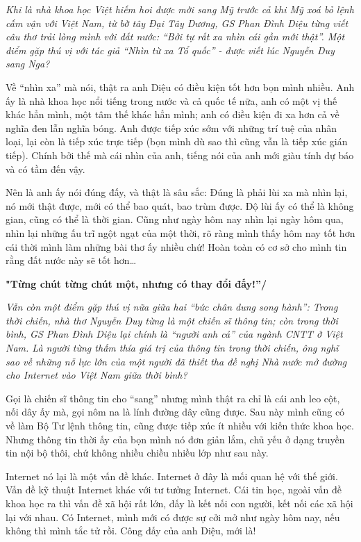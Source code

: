 \emph{Khi là nhà khoa học Việt hiếm hoi được mời sang Mỹ trước cả khi Mỹ xoá bỏ lệnh cấm vận với Việt Nam, từ bờ tây Đại Tây Dương, GS Phan Đình Diệu từng viết câu thơ trải lòng mình với đất nước: “Bởi tự rất xa nhìn cái gần mới thật”. Một điểm gặp thú vị với tác giả “Nhìn từ xa Tổ quốc” - được viết lúc Nguyễn Duy sang Nga?}  

Về “nhìn xa” mà nói, thật ra anh Diệu có điều kiện tốt hơn bọn mình nhiều. Anh ấy là nhà khoa học nổi tiếng trong nước và cả quốc tế nữa, anh có một vị thế khác hẳn mình, một tâm thế khác hẳn mình; anh có điều kiện đi xa hơn cả về nghĩa đen lẫn nghĩa bóng. Anh được tiếp xúc sớm với những trí tuệ của nhân loại, lại còn là tiếp xúc trực tiếp (bọn mình dù sao thì cũng vẫn là tiếp xúc gián tiếp). Chính bởi thế mà cái nhìn của anh, tiếng nói của anh mới giàu tính dự báo và có tầm đến vậy.


Nên là anh ấy nói đúng đấy, và thật là sâu sắc: Đúng là phải lùi xa mà nhìn lại, nó mới thật được, mới có thể bao quát, bao trùm được. Độ lùi ấy có thể là không gian, cũng có thể là thời gian. Cũng như ngày hôm nay nhìn lại ngày hôm qua, nhìn lại những ấu trĩ ngột ngạt của một thời, rõ ràng mình thấy hôm nay tốt hơn cái thời mình làm những bài thơ ấy nhiều chứ! Hoàn toàn có cơ sở cho mình tin rằng đất nước này sẽ tốt hơn…

{\bf "Từng chút từng chút một, nhưng có thay đổi đấy!”/}

\emph{Vẫn còn một điểm gặp thú vị nữa giữa hai “bức chân dung song hành”: Trong thời chiến, nhà thơ Nguyễn Duy từng là một chiến sĩ thông tin; còn trong thời bình, GS Phan Đình Diệu lại chính là “người anh cả” của ngành CNTT ở Việt Nam. Là người từng thấm thía giá trị của thông tin trong thời chiến, ông nghĩ sao về những nỗ lực lớn của một người đã thiết tha đề nghị Nhà nước mở đường cho Internet vào Việt Nam giữa thời bình?}

Gọi là chiến sĩ thông tin cho “sang” nhưng mình thật ra chỉ là cái anh leo cột, nối dây ấy mà, gọi nôm na là lính đường dây cũng được. Sau này mình cũng có về làm Bộ Tư lệnh thông tin, cũng được tiếp xúc ít nhiều với kiến thức khoa học. Nhưng thông tin thời ấy của bọn mình nó đơn giản lắm, chủ yếu ở dạng truyền tin nội bộ thôi, chứ không nhiều chiều nhiều lớp như sau này. 


Internet nó lại là một vấn đề khác. Internet ở đây là mối quan hệ với thế giới. Vấn đề kỹ thuật Internet khác với tư tưởng Internet. Cái tin học, ngoài vấn đề khoa học ra thì vấn đề xã hội rất lớn, đấy là kết nối con người, kết nối các xã hội lại với nhau. Có Internet, mình mới có được sự cởi mở như ngày hôm nay, nếu không thì mình tắc tử rồi. Công đấy của anh Diệu, mới là!

